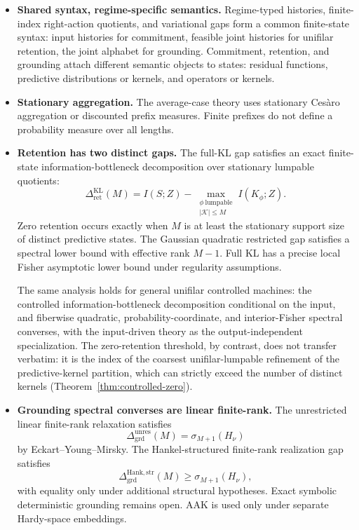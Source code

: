 \documentclass[12pt]{article}
\theoremstyle{definition}
\newcommand{\RetKL}{\Delta_{\mathrm{ret}}^{\mathrm{KL}}}
\newcommand{\Dunres}{\Delta_{\mathrm{grd}}^{\mathrm{unres}}}
\newcommand{\DHankstr}{\Delta_{\mathrm{grd}}^{\mathrm{Hank,str}}}
\begin{document}
\begin{itemize}[leftmargin=1.8em]
\item \textbf{Shared syntax, regime-specific semantics.}
Regime-typed histories, finite-index right-action quotients, and variational
gaps form a common finite-state syntax: input histories for commitment,
feasible joint histories for unifilar retention, the joint alphabet for
grounding.  Commitment, retention, and grounding attach different semantic
objects to states: residual functions, predictive distributions or kernels,
and operators or kernels.

\item \textbf{Stationary aggregation.}
The average-case theory uses stationary Ces\`aro aggregation or discounted
prefix measures.  Finite prefixes do not define a probability measure over
all lengths.

\item \textbf{Retention has two distinct gaps.}
The full-KL gap satisfies an exact finite-state information-bottleneck
decomposition over stationary lumpable quotients:
\[
\RetKL(M)
=
I(S;Z)
-
\max_{\substack{
\phi\ \text{lumpable}\\
|\mathcal K|\le M
}}
I(K_\phi;Z).
\]
Zero retention occurs exactly when $M$ is at least the stationary support size
of distinct predictive states.  The Gaussian quadratic restricted gap satisfies
a spectral lower bound with effective rank $M-1$.  Full KL has a precise local
Fisher asymptotic lower bound under regularity assumptions.

The same analysis holds for general unifilar controlled machines: the
controlled information-bottleneck decomposition conditional on the input, and
fiberwise quadratic, probability-coordinate, and interior-Fisher spectral
converses, with the input-driven theory as the output-independent
specialization.  The zero-retention threshold, by contrast, does not transfer
verbatim: it is the index of the coarsest unifilar-lumpable refinement of the
predictive-kernel partition, which can strictly exceed the number of distinct
kernels (Theorem~\ref{thm:controlled-zero}).

\item \textbf{Grounding spectral converses are linear finite-rank.}
The unrestricted linear finite-rank relaxation satisfies
\[
\Dunres(M)
=
\sigma_{M+1}(H_\nu)
\]
by Eckart--Young--Mirsky.  The Hankel-structured finite-rank realization gap
satisfies
\[
\DHankstr(M)
\ge
\sigma_{M+1}(H_\nu),
\]
with equality only under additional structural hypotheses.  Exact symbolic
deterministic grounding remains open.  AAK is used only under separate
Hardy-space embeddings.


\end{itemize}
\end{document}
